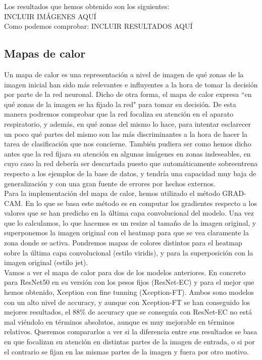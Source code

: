 \documentclass[11pt,a4paper]{article}
\theoremstyle{definition}
\begin{document}
Los resultados que hemos obtenido son los siguientes:\\

INCLUIR IMÁGENES AQUÍ\\

Como podemos comprobar: INCLUIR RESULTADOS AQUÍ

\subsection{Mapas de calor}


Un mapa de calor es una representación a nivel de imagen de qué zonas de la imagen inicial han sido más relevantes e influyentes a la hora de tomar la decisión por parte de la red neuronal. Dicho de otra forma, el mapa de calor expresa ``en qué zonas de la imagen se ha fijado la red" para tomar su decisión. De esta manera podremos comprobar que la red focaliza su atención en el aparato respiratorio, y además, en qué zonas del mismo lo hace, para intentar esclarecer un poco qué partes del mismo son las más discriminantes a la hora de hacer la tarea de clasificación que nos concierne.  También pudiera ser como hemos dicho antes que la red fijara su atención en algunas imágenes en zonas indeseables, en cuyo caso la red debería ser descartada puesto que automáticamente sobreentrena respecto a los ejemplos de la base de datos, y tendría una capacidad muy baja de generalización y con una gran fuente de errores por hechos externos.\\

Para la implementación del mapa de calor, hemos utilizado el método GRAD-CAM.  En lo que se basa este método es en computar los gradientes respecto a los valores que se han predicho en la última capa convolucional del modelo. Una vez que lo calculamos, lo que hacemos es un resize al tamaño de la imagen original, y superponemos la imagen original con el heatmap para que se vea claramente la zona donde se activa.  Pondremos mapas de colores distintos para el heatmap sobre la última capa convolucional (estilo viridis),  y para la superposición con la imagen original (estilo jet).\\

Vamos a ver el mapa de calor para dos de los modelos anteriores. En concreto para ResNet50 en su versión con los pesos fijos (ResNet-EC) y para el mejor que hemos obtenido, Xception con fine tunning (Xception-FT). Ambos sono modelos con un alto nivel de accuracy, y aunque con Xception-FT se han conseguido los mejores resultados,  el 88\% de accuracy que se conseguía con ResNet-EC no está mal viéndolo en términos absolutos, aunque es muy mejorable en términos relativos.  Queremos compararlos a ver si la diferencia entre sus resultados se basa en que focalizan su atención en distintas partes de la imagen de entrada, o si por el contrario se fijan en las mismas partes de la imagen y fuera por otro motivo.
\end{document}
